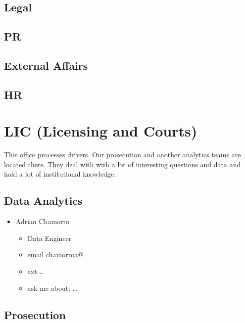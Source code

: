 \documentclass[
]{book}
\providecommand{\tightlist}{%
  \setlength{\itemsep}{0pt}\setlength{\parskip}{0pt}}
\begin{document}
\hypertarget{legal}{%
\subsection{Legal}\label{legal}}

\hypertarget{pr}{%
\subsection{PR}\label{pr}}

\hypertarget{external-affairs}{%
\subsection{External Affairs}\label{external-affairs}}

\hypertarget{hr}{%
\subsection{HR}\label{hr}}

\hypertarget{lic-licensing-and-courts}{%
\section{LIC (Licensing and Courts)}\label{lic-licensing-and-courts}}

This office processes drivers. Our prosecution and another analytics teams are located there. They deal with with a lot of interesting questions and data and hold a lot of institutional knowledge.

\hypertarget{data-analytics}{%
\subsection{Data Analytics}\label{data-analytics}}

\begin{itemize}
\tightlist
\item
  Adrian Chamorro

  \begin{itemize}
  \tightlist
  \item
    Data Engineer
  \item
    email chamorroa@
  \item
    ext \ldots{}
  \item
    ask me about: \ldots{}
  \end{itemize}
\end{itemize}

\hypertarget{prosecution}{%
\subsection{Prosecution}\label{prosecution}}
\end{document}
